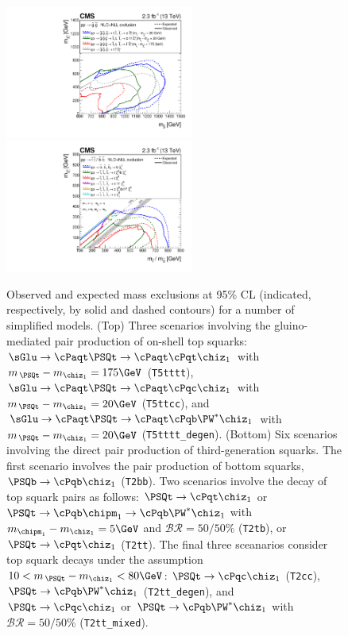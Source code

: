 \begin{figure}[!h]
  \begin{center}
    \includegraphics[width=0.55\textwidth]{figures/limits/v1/naturalWT1SUMMARY.pdf}
    \includegraphics[width=0.55\textwidth]{figures/limits/v1/allThirdGenSUMMARY.pdf} 
    \caption{ Observed and expected mass exclusions at 95\% CL
      (indicated, respectively, by solid and dashed contours) for a
      number of simplified models. (Top) Three scenarios involving the
      gluino-mediated pair production of on-shell top squarks:
      $\sGlu\ra\cPaqt\PSQt\ra\cPaqt\cPqt\chiz_1$ with $m_{\,\PSQt} -
      m_{\chiz_1} = 175\GeV$ (\texttt{T5tttt}),
      $\sGlu\ra\cPaqt\PSQt\ra\cPaqt\cPqc\chiz_1$ with $m_{\,\PSQt} -
      m_{\chiz_1} = 20\GeV$ (\texttt{T5ttcc}), and
      $\sGlu\ra\cPaqt\PSQt\ra\cPaqt\cPqb\PW^*\chiz_1$ with
      $m_{\,\PSQt} - m_{\chiz_1} = 20\GeV$
      (\texttt{T5tttt\_degen}). (Bottom) Six scenarios involving the
      direct pair production of third-generation squarks. The first
      scenario involves the pair production of bottom squarks,
      $\PSQb\ra\cPqb\chiz_1$ (\texttt{T2bb}). Two scenarios involve
      the decay of top squark pairs as follows: $\PSQt\ra\cPqt\chiz_1$
      or $\PSQt\ra\cPqb\chipm_1\ra\cPqb\PW^*\chiz_1$ with
      $m_{\chipm_1} - m_{\chiz_1} = 5\GeV$ and $\mathcal{BR} =
      50/50\%$ (\texttt{T2tb}), or $\PSQt\ra\cPqt\chiz_1$
      (\texttt{T2tt}). The final three sceanarios consider top squark
      decays under the assumption $10 < m_{\,\PSQt} - m_{\chiz_1} <
      80\GeV$: $\PSQt\ra\cPqc\chiz_1$ (\texttt{T2cc}),
      $\PSQt\ra\cPqb\PW^*\chiz_1$ (\texttt{T2tt\_degen}), and
      $\PSQt\ra\cPqc\chiz_1$ or $\PSQt\ra\cPqb\PW^*\chiz_1$ with
      $\mathcal{BR} = 50/50\%$ (\texttt{T2tt\_mixed}).  }
    \label{fig:limits-sms-2} 
  \end{center} 
\end{figure}

